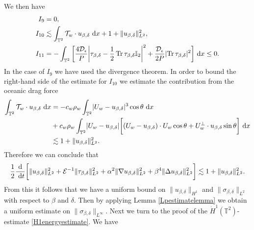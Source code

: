 \documentclass[12pt,a4paper]{article}
\theoremstyle{definition}
\theoremstyle{remark}
\numberwithin{equation}{section}
\newcommand{\dx}{\ {\rm d} {x}}
\newcommand{\dt}{\ {\rm d} t }
\DeclareMathOperator{\Tr}{Tr}
\begin{document}
We then have 
\begin{align*}
I_9 &= 0, \\
I_{10} &\lesssim \int_{\mathbb{T}^2} \mathcal{T}_w \cdot u_{\beta,\delta} \dx + 1 + \lVert u_{\beta,\delta} \rVert_{L^2}^2, \\
I_{11} &= - \int_{\mathbb{T}^2} \bigg[ \frac{4 \mathcal{D}_\epsilon}{P} \bigg\lvert \tau_{\beta,\delta} - \frac{1}{2} \Tr \tau_{\beta,\delta} \mathbb I_2 \bigg\rvert^2 + \frac{\mathcal{D}_\epsilon}{2 P} \lvert \Tr \tau_{\beta,\delta} \rvert^2 \bigg] \dx \leq 0.
\end{align*}
In the case of $I_9$ we have used the divergence theorem. In order to bound the right-hand side of the estimate for $I_{10}$ we estimate the contribution from the oceanic drag force
\begin{align*}
\int_{\mathbb{T}^2} \mathcal{T}_w \cdot u_{\beta,\delta} \dx &= - c_w \rho_w \int_{\mathbb{T}^2} \lvert U_w - u_{\beta,\delta} \rvert^3 \cos \theta \dx \\
&+ c_w \rho_w \int_{\mathbb{T}^2} \lvert U_w - u_{\beta,\delta} \rvert \bigg[ (U_w - u_{\beta,\delta}) \cdot U_w \cos \theta + U_w^\perp \cdot u_{\beta,\delta} \sin \theta \bigg] \dx \\
&\lesssim 1 + \lVert u_{\beta,\delta} \rVert_{L^2}^2.
\end{align*}
Therefore we can conclude that
\begin{align} \label{L2estimate}
\frac{1}{2} \frac{\textrm{d}}{\dt} \bigg[ \lVert u_{\beta,\delta} \rVert_{L^2}^2 + \mathcal{E}^{-1} \lVert \tau_{\beta,\delta} \rVert_{L^2}^2 + \alpha^2 \lVert \nabla u_{\beta,\delta} \rVert_{L^2}^2 + \beta^4 \lVert \Delta u_{\beta,\delta} \rVert_{L^2}^2 \bigg] \lesssim 1 + \lVert u_{\beta,\delta} \rVert_{L^2}^2.
\end{align}
From this it follows that we have a uniform bound on $\lVert u_{\beta,\delta} \rVert_{H^1}$ and $\lVert \sigma_{\beta,\delta} \rVert_{L^2}$ with respect to $\beta$ and $\delta$. Then by applying Lemma \ref{Lpestimatelemma} we obtain a uniform estimate on $\lVert \sigma_{\beta,\delta} \rVert_{L^\infty}$. Next we turn to the proof of the $\dot{H}^1 (\mathbb{T}^2)$-estimate \eqref{H1energyestimate}. We have
\end{document}
